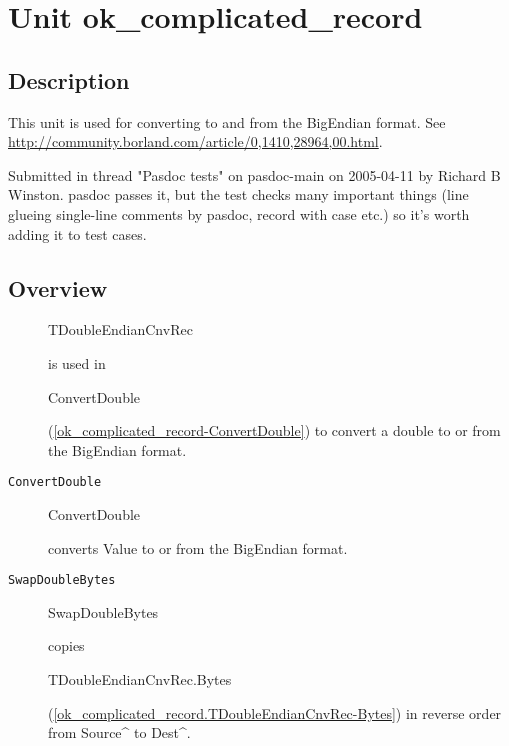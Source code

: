 \documentclass{report}
\begin{document}
\chapter{Unit ok{\_}complicated{\_}record}
\label{ok_complicated_record}
\section{Description}
 This unit is used for converting to and from the BigEndian format. See \href{http://community.borland.com/article/0,1410,28964,00.html}{http://community.borland.com/article/0,1410,28964,00.html}.\hfill\vspace*{1ex}

Submitted in thread "Pasdoc tests" on pasdoc{-}main on 2005{-}04{-}11 by Richard B Winston. pasdoc passes it, but the test checks many important things (line glueing single{-}line comments by pasdoc, record with case etc.) so it's worth adding it to test cases.


\section{Overview}
\begin{description}
\item[\texttt{\begin{ttfamily}TDoubleEndianCnvRec\end{ttfamily} Packed Record}]\begin{ttfamily}TDoubleEndianCnvRec\end{ttfamily} is used in \begin{ttfamily}ConvertDouble\end{ttfamily}(\ref{ok_complicated_record-ConvertDouble}) to convert a double to or from the BigEndian format.
\end{description}
\begin{description}
\item[\texttt{ConvertDouble}]\begin{ttfamily}ConvertDouble\end{ttfamily} converts Value to or from the BigEndian format.
\item[\texttt{SwapDoubleBytes}]\begin{ttfamily}SwapDoubleBytes\end{ttfamily} copies \begin{ttfamily}TDoubleEndianCnvRec.Bytes\end{ttfamily}(\ref{ok_complicated_record.TDoubleEndianCnvRec-Bytes}) in reverse order from Source{\^{}} to Dest{\^{}}.
\end{description}
\end{document}
